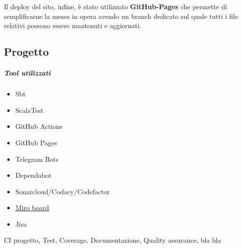         Il deploy del sito, infine, è stato utilizzato \textbf{GitHub-Pages} che permette di semplificarne la messa in opera avendo un branch dedicato sul quale tutti i file relativi possono essere mantenuti e aggiornati.
        

    \subsection{Progetto}
        \subparagraph{Tool utilizzati}
        \begin{itemize}
            \item Sbt
            \item ScalaTest
            \item GitHub Actions
            \item GitHub Pages
            \item Telegram Bots
            \item Dependabot
            \item Sonarcloud/Codacy/Codefactor
            \item \href{https://miro.com/app/board/uXjVPN93uLs=/?share_link_id=56431555728}{Miro board}
            \item Jira
        \end{itemize}
    CI progetto, Test, Coverage, Documentazione, Quality assurance, bla bla
        







